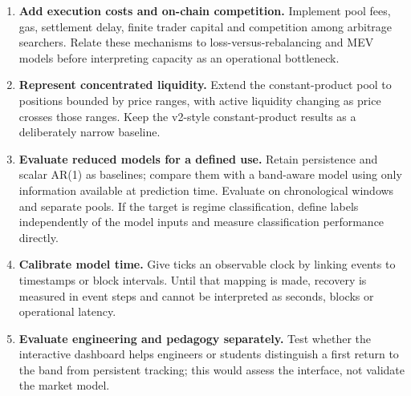 \begin{enumerate}
  \item \textbf{Add execution costs and on-chain competition.} Implement pool fees, gas, settlement delay, finite trader capital and competition among arbitrage searchers. Relate these mechanisms to loss-versus-rebalancing and MEV models before interpreting capacity as an operational bottleneck.
  \item \textbf{Represent concentrated liquidity.} Extend the constant-product pool to positions bounded by price ranges, with active liquidity changing as price crosses those ranges. Keep the v2-style constant-product results as a deliberately narrow baseline.
  \item \textbf{Evaluate reduced models for a defined use.} Retain persistence and scalar AR(1) as baselines; compare them with a band-aware model using only information available at prediction time. Evaluate on chronological windows and separate pools. If the target is regime classification, define labels independently of the model inputs and measure classification performance directly.
  \item \textbf{Calibrate model time.} Give ticks an observable clock by linking events to timestamps or block intervals. Until that mapping is made, recovery is measured in event steps and cannot be interpreted as seconds, blocks or operational latency.
  \item \textbf{Evaluate engineering and pedagogy separately.} Test whether the interactive dashboard helps engineers or students distinguish a first return to the band from persistent tracking; this would assess the interface, not validate the market model.
\end{enumerate}
